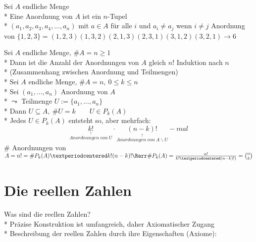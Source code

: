 Sei $A$ endliche Menge\\*
Eine Anordnung von $A$ ist ein $n$-Tupel\\*
$(a_1,a_2,a_3,a_4,…,a_n)$ mit $a\in A$ für alle $i$ und $a_i\neq a_j$ wenn $i\neq j$
%
\bsp
Anordnung von $\{1,2,3\}=(1,2,3)(1,3,2)(2,1,3)(2,3,1)(3,1,2)(3,2,1)→6$

Sei $A$ endliche Menge, $\#A=n\geq 1$\\*
Dann ist die Anzahl der Anordnungen von $A$ gleich $n!$
\bew
Induktion nach $n$\\*
%
\bem
(Zusammenhang zwischen Anordnung und Teilmengen)\\*
Sei $A$ endliche Menge, $\#A=n,\ 0\leq k\leq n$\\*
Sei $(a_1,…,a_n)$ Anordnung von $A$\\*
$\leadsto$ Teilmenge $U:=\{a_1,…,a_n\}$\\*
Dann $U\subseteq A,\ \#U=k\qquad U\in P_k(A)$\\*
Jedes $U\in P_k(A)$ entsteht so, aber mehrfach:
$$\underset{\overset{\uparrow}{Anordnungen\ von\ U}}{k!}·\underset{\overset{\uparrow}{Anordnungen\ von\ A\backslash U}}{(n-k)!}-mal$$
$\#$ Anordnungen von $A=n!=\#P_k(A)·k!(n-k)!\Rarr\#P_k(A)=\frac{n!}{k!·(n-k)!)}=\binom{n}{k}$

\chapter{Die reellen Zahlen}
Was sind die reellen Zahlen?\\*
Präzise Konstruktion ist umfangreich, daher Axiomatischer Zugang\\*
Beschreibung der reellen Zahlen durch ihre Eigenschaften (Axiome):

